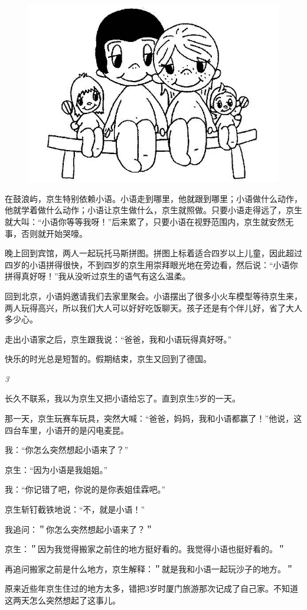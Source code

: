 \documentclass[twoside,openright,headings=optiontohead]{ctexbook} %
\begin{document}
{\begin{figure}

{\centering \includegraphics[width=0.3\linewidth]{images/xiaoyu2} 

}

\end{figure}

在鼓浪屿，京生特别依赖小语。小语走到哪里，他就跟到哪里；小语做什么动作，他就学着做什么动作；小语让京生做什么，京生就照做。只要小语走得远了，京生就大叫：``小语你等等我呀！''后来累了，只要小语在视野范围内，京生就安然无事，否则就开始哭嚎。

晚上回到宾馆，两人一起玩托马斯拼图。拼图上标着适合四岁以上儿童，因此超过四岁的小语拼得很快，不到四岁的京生用崇拜眼光地在旁边看，然后说：``小语你拼得真好呀！''我从没听过京生的语气有这么温柔。

回到北京，小语妈邀请我们去家里聚会。小语摆出了很多小火车模型等待京生来，两人玩得高兴，所以我们大人可以好好吃饭聊天。孩子还是有个伴儿好，省了大人多少心。

走出小语家之后，京生跟我说：``爸爸，我和小语玩得真好呀。''

快乐的时光总是短暂的。假期结束，京生又回到了德国。

\emph{3}

长久不联系，我以为京生又把小语给忘了。直到京生5岁的一天。

那一天，京生玩赛车玩具，突然大喊：``爸爸，妈妈，我和小语都赢了！''他说，这四台车里，小语开的是闪电麦昆。

我：``你怎么突然想起小语来了？''

京生：``因为小语是我姐姐。''

我：``你记错了吧，你说的是你表姐佳霖吧。''

京生斩钉截铁地说：``不，就是小语！''

我追问：＂你怎么突然想起小语来了？＂

京生：＂因为我觉得搬家之前住的地方挺好看的。我觉得小语也挺好看的。＂

再追问搬家之前是什么地方，京生解释：＂就是我和小语一起玩沙子的地方。＂

原来近些年京生住过的地方太多，错把3岁时厦门旅游那次记成了自己家。不知道这两天怎么突然想起了这事儿。

}
\end{document}
